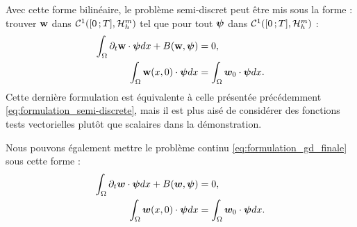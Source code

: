 Avec cette forme bilinéaire, le problème semi-discret peut être
mis sous la forme : trouver $\bm{\mathrm{w}}$ dans $\mathcal{C}^1(\lbrack0\,;T\rbrack,\mathcal{H}_h^m)$
tel que pour tout $\bm{\psi}$ dans $\mathcal{C}^1(\lbrack0\,;T\rbrack,\mathcal{H}_h^m)$ :
\begin{subequations}
	\begin{align}
		\int_{\Omega} \partial_{t} \bm{\mathrm{w}} \cdot \bm{\psi} dx
		+ B(\bm{\mathrm{w}},\bm{\psi}) &= 0 ,
		\\
		\int_{\Omega} \bm{\mathrm{w}}(x,0) \cdot \bm{\psi} dx
		&= \int_{\Omega} \bm{w}_0 \cdot \bm{\psi} dx .
	\end{align}
\end{subequations}
Cette dernière formulation est équivalente à celle présentée précédemment
\eqref{eq:formulation_semi-discrete}, mais il est plus aisé de considérer
des fonctions tests vectorielles plutôt que scalaires dans la démonstration.

Nous pouvons également mettre le problème continu
\eqref{eq:formulation_gd_finale} sous cette forme :
\begin{subequations}
	\begin{align}
		\int_{\Omega} \partial_{t} \bm{w} \cdot \bm{\psi} dx
		+ B(\bm{w},\bm{\psi}) &= 0 ,
		\\
		\int_{\Omega} \bm{w}(x,0) \cdot \bm{\psi} dx
		&= \int_{\Omega} \bm{w}_0 \cdot \bm{\psi} dx .
	\end{align}
\end{subequations}

